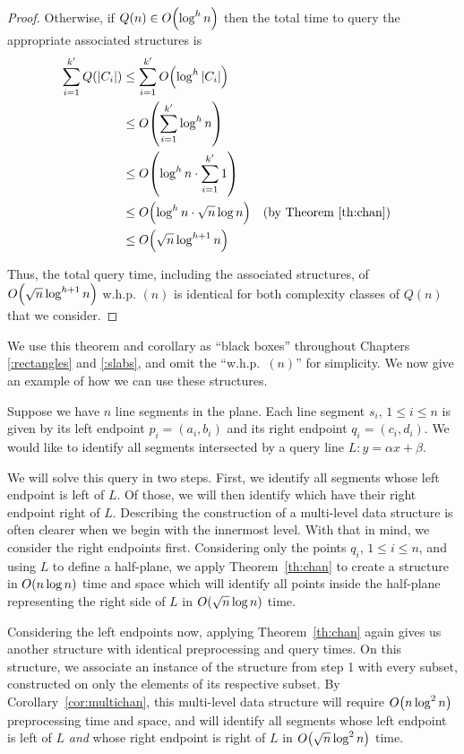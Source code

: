 \begin{proof}
\noindent Otherwise, if $Q(n) \in O\!\left(\log^h{n}\right)$ then the total time to query the appropriate associated structures is
\begin{align*}
\sum_{i=1}^{k'}{Q(|C_i|)}
&\leq \sum_{i=1}^{k'}{\BigOh{\log^h{|C_i|}}} \\
%
&\leq \BigOh{\sum_{i=1}^{k'}{\log^h{n}}} \\
%
&\leq \BigOh{\log^h{n} \cdot \sum_{i=1}^{k'}{1}} \\
%
&\leq \BigOh{\log^h{n} \cdot \sqrt{n}\log{n}} && \text{(by Theorem \ref{th:chan})}\\
%
&\leq \BigOh{\sqrt{n}\log^{h+1}{n}} \\
\end{align*}

\noindent Thus, the total query time, including the associated structures, of $O\!\left(\sqrt{n}\log^{h+1}{n}\right)$ w.h.p. $(n)$ is identical for both complexity classes of $Q(n)$ that we consider. 
\end{proof}

We use this theorem and corollary as ``black boxes'' throughout Chapters \ref{:rectangles} and \ref{:slabs}, and omit the ``w.h.p.~$(n)$'' for simplicity.
We now give an example of how we can use these structures.

Suppose we have $n$ line segments in the plane.
Each line segment $s_i$, $1 \leq i \leq n$ is given by its left endpoint $p_i = (a_i, b_i)$ and its right endpoint $q_i = (c_i, d_i)$.
We would like to identify all segments intersected by a query line $L: y = \alpha x + \beta$.

We will solve this query in two steps.
First, we identify all segments whose left endpoint is left of $L$.
Of those, we will then identify which have their right endpoint right of $L$.
Describing the construction of a multi-level data structure is often clearer when we begin with the innermost level.
With that in mind, we consider the right endpoints first. 
Considering only the points $q_i$, $1 \leq i \leq n$, and using $L$ to define a half-plane, we apply 
Theorem~\ref{th:chan} to create a structure in $O\!\left(n\log{n}\right)$ time and space which will identify all points inside the half-plane representing the right side of $L$ in $O\!\left(\sqrt{n}\log{n}\right)$ time.  

Considering the left endpoints now, applying Theorem~\ref{th:chan} again gives us another structure with identical preprocessing and query times. 
On this structure, we associate an instance of the structure from step 1 with every subset, constructed on only the elements of its respective subset.
By Corollary~\ref{cor:multichan}, this multi-level data structure will require $O\!\left(n\log^2{n}\right)$ preprocessing time and space, and will identify all segments whose left endpoint is left of $L$ \emph{and} whose right endpoint is right of $L$ in $O\!\left(\sqrt{n}\log^2{n}\right)$ time.
